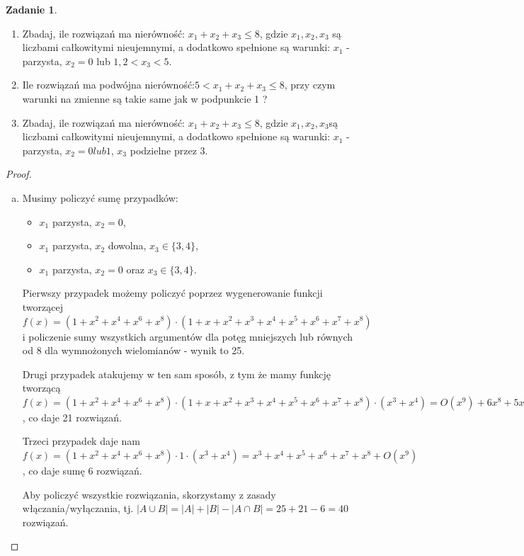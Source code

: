 \documentclass[11pt]{article}
\theoremstyle{definition}
\newtheorem{zadanie}{Zadanie}
\numberwithin{zadanie}{subsection}
\begin{document}
\begin{zadanie}
    \begin{enumerate}
        \item Zbadaj, ile rozwiązań ma nierówność: $x_1 + x_2 + x_3 \leq 8$, gdzie $x_1, x_2, x_3$ są
              liczbami całkowitymi nieujemnymi, a dodatkowo spełnione są warunki: $x_1$ - parzysta,
              $x_2 = 0$ lub $1, 2 < x_3 < 5$.
        \item Ile rozwiązań ma podwójna nierówność:$ 5 < x_1 + x_2 + x_3 \leq 8$, przy czym warunki
              na zmienne są takie same jak w podpunkcie 1 ?
        \item Zbadaj, ile rozwiązań ma nierówność: $x_1 + x_2 + x_3 \leq 8$,
              gdzie $x_1 , x_2 , x_3 $są liczbami całkowitymi nieujemnymi, a dodatkowo spełnione są warunki:
              $x_1$ - parzysta, $x_2 = 0 lub 1$, $x_3$ podzielne przez $3$.
    \end{enumerate}
\end{zadanie}
\begin{proof}

    \begin{enumerate}[a)]
        \item Musimy policzyć sumę przypadków:
              \begin{itemize}
                  \item $x_1$ parzysta, $x_2 = 0$,
                  \item $x_1$ parzysta, $x_2$ dowolna, $x_3 \in \{3,4\}$,
                  \item $x_1$ parzysta, $x_2 = 0$ oraz $x_3 \in \{3,4\}$.
              \end{itemize}

              Pierwszy przypadek możemy policzyć poprzez wygenerowanie funkcji tworzącej $f(x)=(1+x^2+x^4+x^6+x^8)\cdot(1+x+x^2+x^3+x^4+x^5+x^6+x^7+x^8)$ i policzenie sumy wszystkich argumentów dla potęg mniejszych lub równych od 8 dla wymnożonych wielomianów - wynik to 25.

              Drugi przypadek atakujemy w ten sam sposób, z tym że mamy funkcję tworzącą $f(x)= (1+x^2+x^4+x^6+x^8)\cdot(1+x+x^2+x^3+x^4+x^5+x^6+x^7+x^8)\cdot(x^3+x^4) = O(x^9) + 6 x^8 + 5 x^7 + 4 x^6 + 3 x^5 + 2 x^4 + x^3$, co daje 21 rozwiązań.

              Trzeci przypadek daje nam $f(x)= (1+x^2+x^4+x^6+x^8)\cdot1\cdot(x^3+x^4) = x^3+x^4+x^5+x^6+x^7+x^8+O(x^9)$, co daje sumę 6 rozwiązań.

              Aby policzyć wszystkie rozwiązania, skorzystamy z zasady włączania/wyłączania, tj. $|A\cup B| = |A|+|B| - |A\cap B| = 25+21-6 = 40$ rozwiązań.
    \end{enumerate}
\end{proof}
\end{document}
